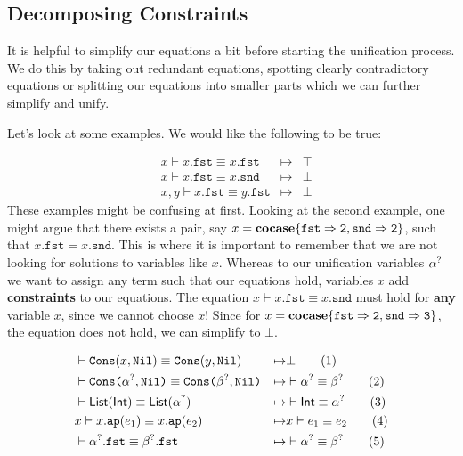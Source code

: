 \documentclass[twoside,12pt,a4paper]{article}
\begin{document}
\subsection{Decomposing Constraints}

It is helpful to simplify our equations a bit before starting the unification process.
We do this by taking out redundant equations, spotting clearly contradictory equations or splitting our equations into smaller parts which we can further simplify and unify.

Let's look at some examples. We would like the following to be true:
\begin{example}
    \begin{align*}
    &x \vdash x.\mathtt{fst} \equiv x.\mathtt{fst} &\mapsto& \top
    \tag{1}\\
    &x \vdash x.\mathtt{fst} \equiv x.\mathtt{snd} &\mapsto& \bot 
    \tag{2}\\
    &x,y \vdash x.\mathtt{fst} \equiv y.\mathtt{fst} &\mapsto& \bot 
    \tag{3}
    \end{align*}
    These examples might be confusing at first. Looking at the second example, one might argue that there exists a pair, say $x = \textbf{cocase}\{\mathtt{fst\Rightarrow 2, snd\Rightarrow 2}\}$, such that
    $x.\mathtt{fst} = x.\mathtt{snd}$. This is where it is important to remember that we are not looking for solutions to variables like $x$.
    Whereas to our unification variables $\alpha^?$ we want to assign any term such that our equations hold, variables $x$ add \textbf{constraints} to our equations. 
    The equation $x \vdash x.\mathtt{fst} \equiv x.\mathtt{snd}$ must hold for \textbf{any} variable $x$, since we cannot choose $x$! 
    Since for $x = \textbf{cocase}\{\mathtt{fst\Rightarrow 2, snd\Rightarrow 3}\}$, the equation does not hold, we can simplify to $\bot$.
\end{example}

\begin{example}
    \begin{align*}
    &\vdash \mathtt{Cons(}x, \mathtt{Nil}\mathtt{)} \equiv \mathtt{Cons(}y, \mathtt{Nil}\mathtt{)}&\mapsto& \bot
    \tag{1}\\
    &\vdash \texttt{Cons(}\alpha^?, \texttt{Nil)}\equiv\texttt{Cons(}\beta^?, \texttt{Nil)}
    &\mapsto&\vdash \alpha^?\equiv \beta^?
    \tag{2}\\
    &\vdash \mathsf{List(Int)}\equiv \mathsf{List(\alpha^?)}
    &\mapsto& \vdash \mathsf{Int}\equiv \alpha^?
    \tag{3}\\
    &x \vdash x.\texttt{ap}(e_1)\equiv x.\texttt{ap}(e_2) &\mapsto& x\vdash e_1\equiv e_2 
    \tag{4}\\
    &\vdash\mathtt{\alpha^?.fst \equiv \beta^?.fst}&\mapsto& \vdash\alpha^?\equiv \beta^?
    \tag{5}
    \end{align*}
\end{example}
\end{document}
